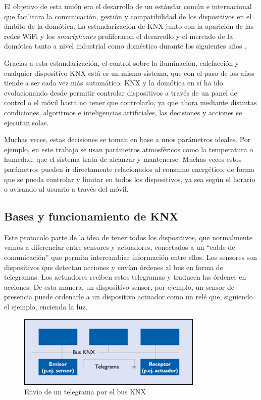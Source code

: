 El objetivo de esta unión era el desarrollo de un estándar común e internacional que facilitara la comunicación, gestión y compatibilidad de los dispositivos en el ámbito de la domótica. La estandarización de KNX junto con la aparición de las redes WiFi y los \textit{smartphones} proliferaron el desarrollo y el mercado de la domótica tanto a nivel industrial como doméstico durante los siguientes años \cite{intro_5}.

Gracias a esta estandarización, el control sobre la iluminación, calefacción y cualquier dispositivo KNX está es un mismo sistema, que con el paso de los años tiende a ser cada vez más automático. KNX y la domótica en sí ha ido evolucionando desde permitir controlar dispositivos a través de un panel de control o el móvil hasta no tener que controlarlo, ya que ahora mediante distintas condiciones, algoritmos e inteligencias artificiales, las decisiones y acciones se ejecutan solas.

Muchas veces, estas decisiones se toman en base a unos parámetros ideales. Por ejemplo, en este trabajo se usan parámetros atmosféricos como la temperatura o humedad, que el sistema trata de alcanzar y mantenerse. Muchas veces estos parámetros pueden ir directamente relacionados al consumo energético, de forma que se pueda controlar y limitar en todos los dispositivos, ya sea según el horario o avisando al usuario a través del móvil.

\subsection{Bases y funcionamiento de KNX}

Este protocolo parte de la idea de tener todos los dispositivos, que normalmente vamos a diferenciar entre sensores y actuadores, conectados a un “cable de comunicación” que permita intercambiar información entre ellos. Los sensores son dispositivos que detectan acciones y envían órdenes al bus en forma de telegramas. Los actuadores reciben estos telegramas y traducen las órdenes en acciones. De esta manera, un dispositivo sensor, por ejemplo, un sensor de presencia puede ordenarle a un dispositivo actuador como un relé que, siguiendo el ejemplo, encienda la luz.

\begin{figure}
    \centering
    \includegraphics{imagenes/capitulo1/envioTelegrama.png}
    \caption{Envío de un telegrama por el bus KNX}
    \label{fig:envio_telegrama}
\end{figure}

